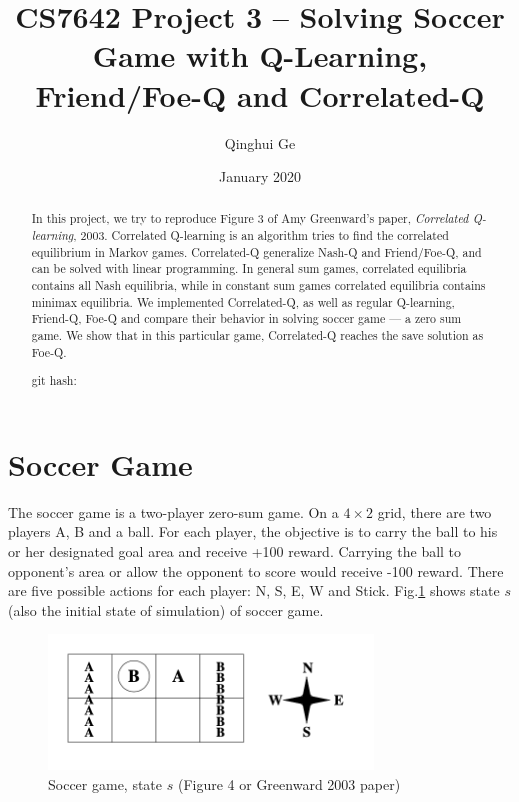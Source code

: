 \documentclass[conference]{IEEEtran}
\title{CS7642 Project 3 -- Solving Soccer Game with Q-Learning, Friend/Foe-Q and Correlated-Q}
\author{Qinghui Ge}
\date{January 2020}
\begin{document}
	
	\maketitle
	
\begin{abstract}
In this project, we try to reproduce Figure 3 of Amy Greenward's paper, \textit{Correlated Q-learning}, 2003\cite{greenwald2003correlated}.  Correlated Q-learning is an algorithm tries to find the correlated equilibrium in Markov games. Correlated-Q generalize Nash-Q and Friend/Foe-Q, and can be solved with linear programming. In general sum games, correlated equilibria contains all Nash equilibria, while in constant sum games correlated equilibria contains minimax equilibria. We implemented Correlated-Q, as well as regular Q-learning, Friend-Q, Foe-Q and compare their behavior in solving soccer game --- a zero sum game. We show that in this particular game, Correlated-Q reaches the save solution as Foe-Q.

	git hash: 
\end{abstract}
	
	
\section{Soccer Game}
The soccer game is a two-player zero-sum game. On a $4\times2$ grid, there are two players A, B and a ball. For each player, the objective is to carry the ball to his or her designated goal area and receive +100 reward. Carrying the ball to opponent's area or allow the opponent to score would receive -100 reward. There are five possible actions for each player: N, S, E, W and Stick. Fig.\ref{fig:state_s} shows state $s$ (also the initial state of simulation) of soccer game.

\begin{figure}[!h]
	\centering
	\includegraphics[width=3.4in]{figures/state_s}
	\caption{Soccer game, state $s$ (Figure 4 or Greenward 2003 paper\cite{greenwald2003correlated})}
	\label{fig:state_s}
\end{figure}
\end{document}
